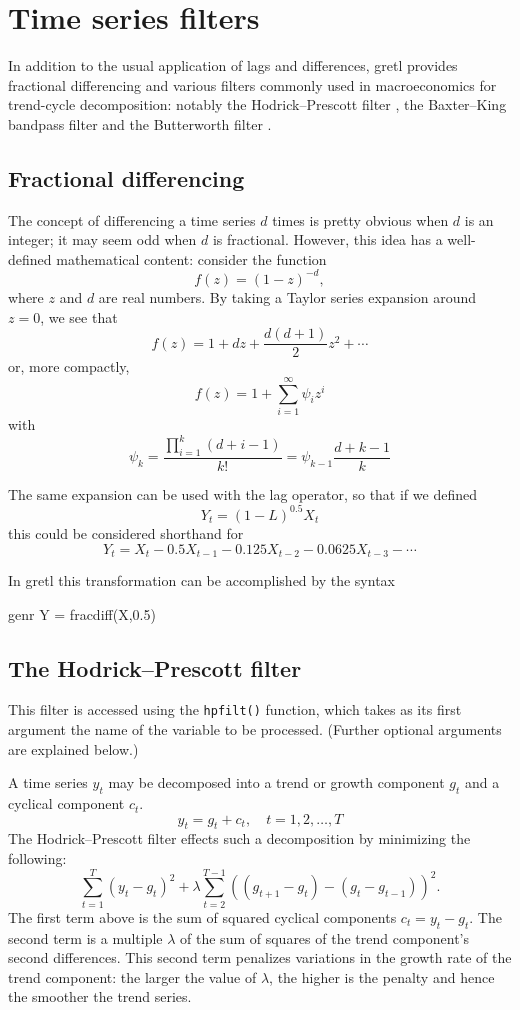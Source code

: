 \chapter{Time series filters}
\label{chap:tsfilter}

In addition to the usual application of lags and differences,
gretl provides fractional differencing and various filters
commonly used in macroeconomics for trend-cycle decomposition: notably
the Hodrick--Prescott filter \citep{hodrick97}, the Baxter--King
bandpass filter \citep{baxter-king99} and the Butterworth
filter \citep{butterworth30}.

\section{Fractional differencing}
\label{sec:fracdiff}

The concept of differencing a time series $d$ times is pretty obvious
when $d$ is an integer; it may seem odd when $d$ is
fractional. However, this idea has a well-defined mathematical
content: consider the function
\[
  f(z) = (1 - z)^{-d},
\]
where $z$ and $d$ are real numbers. By taking a Taylor series
expansion around $z=0$, we see that
\[
  f(z) = 1 + dz + \frac{d (d+1)}{2} z^2 + \cdots 
\]
or, more compactly,
\[
  f(z) = 1 + \sum_{i=1}^{\infty} \psi_i z^i
\]
with
\[
  \psi_k = \frac{\prod_{i=1}^{k} (d+i-1) }{k!} = \psi_{k-1} \frac{d+k-1}{k}
\]

The same expansion can be used with the lag operator, so that if we defined
\[
  Y_t = (1-L)^{0.5} X_t
\]
this could be considered shorthand for
\[
Y_t = X_t - 0.5 X_{t-1} - 0.125 X_{t-2} - 0.0625 X_{t-3} - \cdots 
\]
    
In gretl this transformation can be accomplished by the syntax 
\begin{code}
genr Y = fracdiff(X,0.5)
\end{code}

\section{The Hodrick--Prescott filter}
\label{sec:hodrick-prescott}

This filter is accessed using the \verb+hpfilt()+ function, which
takes as its first argument the name of the variable to be processed.
(Further optional arguments are explained below.)

A time series $y_t$ may be decomposed into a trend or growth
component $g_t$ and a cyclical component $c_t$.  
%
\[
y_t = g_t + c_t, \quad t = 1,2,\dots,T
\]
%
The Hodrick--Prescott filter effects such a decomposition by
minimizing the following:
%
\[
    \sum_{t = 1}^T {(y_t - g_t )^2 } + \lambda \sum_{t = 2}^{T -
      1} \left((g_{t+1} - g_t) - (g_t - g_{t - 1} )\right)^2 .
\]
%
The first term above is the sum of squared cyclical components $c_t =
y_t - g_t$. The second term is a multiple $\lambda$ of the sum of
squares of the trend component's second differences. This
second term penalizes variations in the growth rate of the trend
component: the larger the value of $\lambda$, the higher is the
penalty and hence the smoother the trend series.

